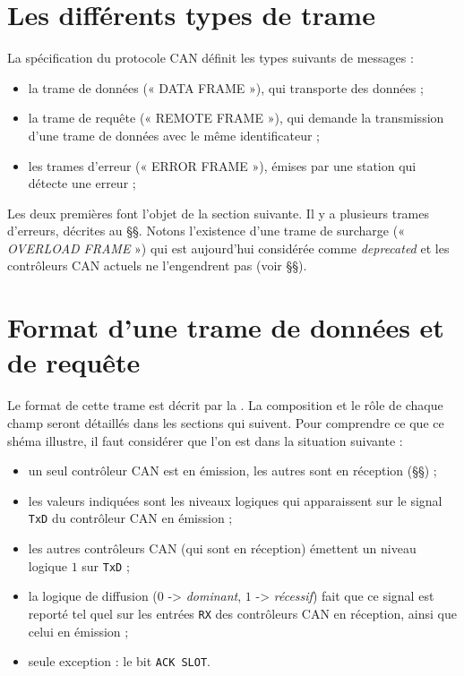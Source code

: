 \section{Les différents types de trame}

La spécification du protocole CAN définit les types suivants de messages :
\begin{itemize}
\item  la trame de données (« DATA FRAME »), qui transporte des données ;
\item  la trame de requête (« REMOTE FRAME »), qui demande la transmission d’une trame de données avec le même identificateur ;
\item  les trames d’erreur (« ERROR FRAME »), émises par une station qui détecte une erreur ;
\end{itemize}

Les deux premières font l'objet de la section suivante. Il y a plusieurs trames d'erreurs, décrites au §§. Notons l'existence d'une trame de surcharge (« \emph{OVERLOAD FRAME} ») qui est aujourd'hui considérée comme \emph{deprecated} et les contrôleurs CAN actuels ne l'engendrent pas (voir §§).






\section{Format d'une trame de données et de requête}

Le format de cette trame est décrit par la . La composition et le rôle de chaque champ seront détaillés dans les sections qui suivent. Pour comprendre ce que ce shéma illustre, il faut considérer que l'on est dans la situation suivante :
\begin{itemize}
  \item un seul contrôleur CAN est en émission, les autres sont en réception (§§) ;
  \item les valeurs indiquées sont les niveaux logiques qui apparaissent sur le signal \texttt{TxD} du contrôleur CAN en émission ;
  \item les autres contrôleurs CAN (qui sont en réception) émettent un niveau logique $1$ sur \texttt{TxD} ;
  \item la logique de diffusion ($0$ -> \emph{dominant}, $1$ -> \emph{récessif}) fait que ce signal est reporté tel quel sur les entrées \texttt{RX} des contrôleurs CAN en réception, ainsi que celui en émission ;
  \item seule exception : le bit \texttt{ACK SLOT}. 
\end{itemize}

